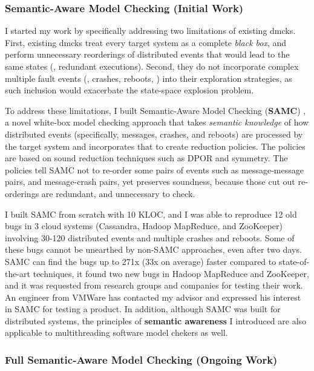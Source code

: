 \documentclass[10pt]{article}
\begin{document}
\subsubsection*{Semantic-Aware Model Checking (Initial Work)} 

I started my work by specifically addressing two limitations of existing dmcks.
First, existing dmcks treat every target system as a complete \textit{black
box}, and perform unnecessary reorderings of distributed events that would lead
to the same states (\ie, redundant executions). Second, they do not incorporate
complex multiple fault events (\eg, crashes, reboots, \etc) into their exploration
strategies, as such inclusion would exacerbate the state-space explosion
problem.

To address these limitations, I built Semantic-Aware Model Checking
(\textbf{SAMC}) \cite{Leesatapornwongsa+15-SamcIssta,Leesatapornwongsa+14-Samc},
a novel white-box model checking approach that takes \textit{semantic knowledge}
of how distributed events (specifically, messages, crashes, and reboots) are
processed by the target system and incorporates that to create reduction
policies. The policies are based on sound reduction techniques such as DPOR and
symmetry. The policies tell SAMC not to re-order some pairs of events such as
message-message pairs, and message-crash pairs, yet preserves soundness, because
those cut out re-orderings are redundant, and unnecessary to check.

I built SAMC from scratch with 10 KLOC, and I was able to reproduce 12 old bugs
in 3 cloud systems (Cassandra, Hadoop MapReduce, and ZooKeeper) involving 30-120
distributed events and multiple crashes and reboots. Some of these bugs cannot
be unearthed by non-SAMC approaches, even after two days. SAMC can find the bugs
up to 271x (33x on average) faster compared to state-of-the-art techniques, it
found two new bugs in Hadoop MapReduce and ZooKeeper, and it was requested from
research groups and companies for testing their work. An engineer from VMWare
has contacted my advisor and expressed his interest in SAMC for testing a
product. In addition, although SAMC was built for distributed systems, the
principles of \textbf{semantic awareness} I introduced are also applicable to
multithreading software model chekers as well.

\subsubsection*{Full Semantic-Aware Model Checking (Ongoing Work)} 
\end{document}

